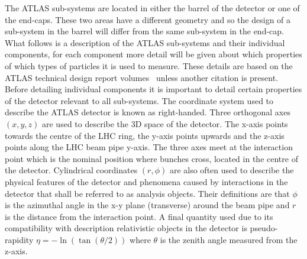 The ATLAS sub-systems are located in either the barrel of the detector or one of
the end-caps. These two areas have a different geometry and so the design of a
sub-system in the barrel will differ from the same sub-system in the end-cap.
What follows is a description of the ATLAS sub-systems and their individual
components, for each component more detail will be given about which properties
of which types of particles it is used to measure. These details are based on
the ATLAS technical design report volumes~\cite{ATLAS-TDR-01, ATLAS-TDR-02}
unless another citation is present. Before detailing individual components it is
important to detail certain properties of the detector relevant to all
sub-systems.  The coordinate system used to describe the ATLAS detector is known
as right-handed. Three orthogonal axes $(x, y, z)$ are used to describe the 3D
space of the detector. The x-axis points towards the centre of the LHC ring, the
y-axis points upwards and the z-axis points along the LHC beam pipe y-axis. The
three axes meet at the interaction point which is the nominal position where
bunches cross, located in the centre of the detector. Cylindrical coordinates
$(r, \phi)$ are also often used to describe the physical features of the
detector and phenomena caused by interactions in the detector that shall be
referred to as analysis objects. Their definitions are that $\phi$ is the
azimuthal angle in the x-y plane (transverse) around the beam pipe and $r$ is
the distance from the interaction point. A final quantity used due to its
compatibility with description relativistic objects in the detector is
pseudo-rapidity $\eta = - \ln(\tan(\theta / 2))$ where $\theta$ is the zenith
angle measured from the z-axis.

